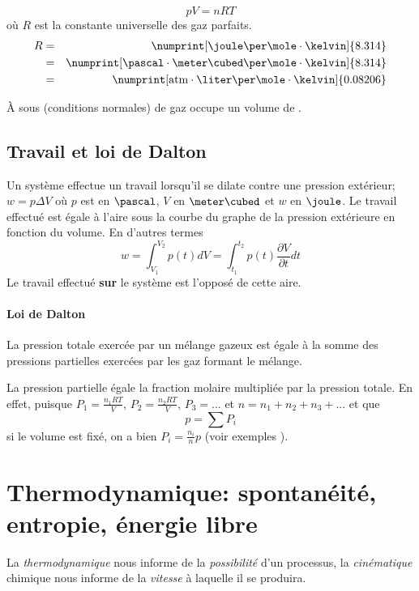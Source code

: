 \[ pV = nRT \]
où $R$ est la constante universelle des gaz parfaits.
\begin{eqnarray*}
  R &=& \numprint[\joule\per\mole\cdot\kelvin]{8.314}\\
       &=& \numprint[\pascal\cdot\meter\cubed\per\mole\cdot\kelvin]{8.314}\\
          &=& \numprint[\atm\cdot\liter\per\mole\cdot\kelvin]{0.08206}
\end{eqnarray*}

\`A  sous  (conditions normales)  de gaz occupe un volume de .

\subsection{Travail et loi de Dalton}

Un système effectue un travail lorsqu'il se dilate contre une pression extérieur; $w=p\Delta V$
où $p$ est en $\pascal$, $V$ en $\meter\cubed$ et $w$ en $\joule$.
Le travail effectué est égale à l'aire sous la courbe du graphe de la pression extérieure en fonction du volume.
En d'autres termes
\[ w = \int_{V_1}^{V_2} p(t) dV = \int_{t_1}^{t_2} p(t) \frac{\partial V}{\partial t} dt \]
Le travail effectué \textbf{sur} le système est l'opposé de cette aire.

\paragraph{Loi de Dalton}
La pression totale exercée par un mélange gazeux est égale à
la somme des pressions partielles exercées par les gaz formant le mélange.

La pression partielle égale la fraction molaire
multipliée par la pression totale.
En effet,
puisque $P_1=\frac{n_1RT}{V}$, $P_2=\frac{n_2RT}{V}$,
$P_3=...$ et $n=n_1+n_2+n_3+...$ et que
$$p=\sum P_i$$ si le volume est fixé, on a bien
$P_i = \frac{n_i}{n}p$ (voir exemples \cite[pp.~36,37]{legras}).


\section{Thermodynamique: spontanéité, entropie, énergie libre}

La \emph{thermodynamique} nous informe de la \emph{possibilité} d'un processus,
la \emph{cinématique} chimique nous informe de la \emph{vitesse} à laquelle il se produira.

